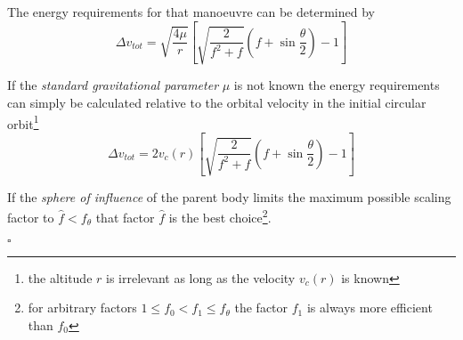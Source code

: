 \documentclass[a4paper, 11pt]{article}
\begin{document}
The energy requirements for that manoeuvre can be determined by
$$\Delta{}v_{tot}= \sqrt{\frac{4\mu}r}\left[ \sqrt{\frac{2}{f^2 + f}} \left(f + \sin\frac{\theta}2 \right) - 1  \right]$$

If the \emph{standard gravitational parameter} $\mu$ is not known the energy requirements can simply be calculated relative to the orbital velocity in the initial circular orbit\footnote{the altitude $r$ is irrelevant as long as the velocity $v_c(r)$ is known}
$$\Delta v_{tot}= 2 v_c(r)\left[ \sqrt{\frac{2}{f^2 + f}} \left(f + \sin\frac{\theta}2 \right) - 1  \right]$$

If the \emph{sphere of influence} of the parent body limits the maximum possible scaling factor to $\hat f < f_\theta$ that factor $\hat f$ is the best choice\footnote{for arbitrary factors $1 \leq f_0 < f_1 \leq f_\theta$ the factor $f_1$ is always more efficient than $f_0$}.

\hfill $\square$
\end{document}
